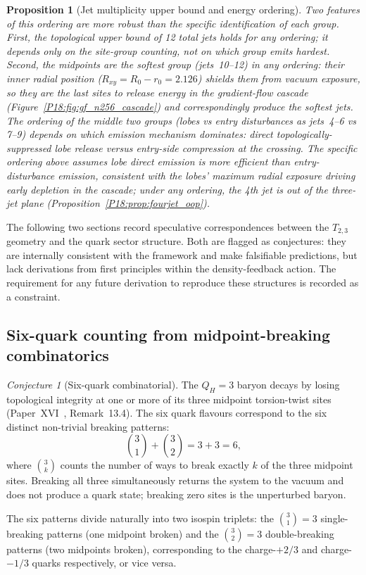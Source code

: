 \documentclass[11pt,a4paper]{article}
\newtheorem{proposition}[theorem]{Proposition}
\theoremstyle{definition}\newtheorem{definition}[theorem]{Definition}
\theoremstyle{remark}
\newtheorem{conjecture}[theorem]{Conjecture}
\newcommand{\QH}{Q_H}
\begin{document}
\begin{proposition}[Jet multiplicity upper bound and energy ordering]
Two features of this ordering are more robust than the specific
identification of each group.  First, the topological upper bound
of 12 total jets holds for any ordering; it depends only on the
site-group counting, not on which group emits hardest.  Second,
the midpoints are the softest group (jets~10--12) in any ordering:
their inner radial position ($R_{xy}=R_0-r_0=2.126$) shields them
from vacuum exposure, so they are the last sites to release energy
in the gradient-flow cascade
(Figure~\ref{P18:fig:gf_n256_cascade}) and correspondingly produce the
softest jets.  The ordering of the middle two groups (lobes vs
entry disturbances as jets~4--6 vs 7--9) depends on which emission
mechanism dominates: direct topologically-suppressed lobe release
versus entry-side compression at the crossing.  The specific
ordering above assumes lobe direct emission is more efficient
than entry-disturbance emission, consistent with the lobes'
maximum radial exposure driving early depletion in the cascade;
under any ordering, the 4th jet is out of the three-jet plane
(Proposition~\ref{P18:prop:fourjet_oop}).
\end{proposition}
\label{P18:sec:speculative}

The following two sections record speculative correspondences between
the $T_{2,3}$ geometry and the quark sector structure.  Both are
flagged as conjectures: they are internally consistent with the
framework and make falsifiable predictions, but lack derivations from
first principles within the density-feedback action.  The requirement
for any future derivation to reproduce these structures is recorded
as a constraint.

\subsection{Six-quark counting from midpoint-breaking combinatorics}
\label{P18:sec:quark_count}

\begin{conjecture}[Six-quark combinatorial]
\label{P18:conj:six_quarks}
The $\QH=3$ baryon decays by losing topological integrity at one
or more of its three midpoint torsion-twist sites
(Paper~XVI~\cite{Paper16}, Remark~13.4).   %
The six quark flavours correspond to the six distinct non-trivial
breaking patterns:
\begin{equation}
  \binom{3}{1}+\binom{3}{2} = 3+3 = 6,
  \label{P18:eq:quark_count}
\end{equation}
where $\binom{3}{k}$ counts the number of ways to break exactly
$k$ of the three midpoint sites.  Breaking all three simultaneously
returns the system to the vacuum and does not produce a quark state;
breaking zero sites is the unperturbed baryon.

The six patterns divide naturally into two isospin triplets:
the $\binom{3}{1}=3$ single-breaking patterns (one midpoint broken)
and the $\binom{3}{2}=3$ double-breaking patterns (two midpoints
broken), corresponding to the charge-$+2/3$ and charge-$-1/3$
quarks respectively, or vice versa.
\end{conjecture}
\end{document}
